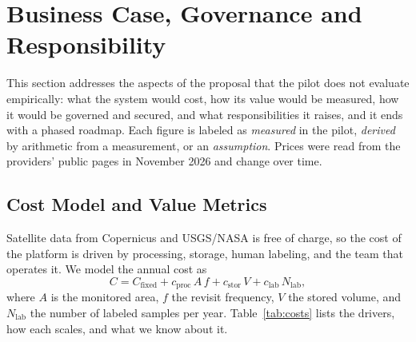 \documentclass{article}
\begin{document}
\section{Business Case, Governance and Responsibility}
\label{sec:business}

This section addresses the aspects of the proposal that the pilot does not
evaluate empirically: what the system would cost, how its value would be
measured, how it would be governed and secured, and what responsibilities it
raises, and it ends with a phased roadmap. Each figure is labeled as
\emph{measured} in the pilot, \emph{derived} by arithmetic from a measurement, or
an \emph{assumption}. Prices were read from the providers' public pages in
November 2026 and change over time.

\subsection{Cost Model and Value Metrics}
\label{sec:costs}

Satellite data from Copernicus and USGS/NASA is free of charge, so the cost of
the platform is driven by processing, storage, human labeling, and the team
that operates it. We model the annual cost as
\begin{equation}
C = C_{\text{fixed}} + c_{\text{proc}}\,A\,f + c_{\text{stor}}\,V + c_{\text{lab}}\,N_{\text{lab}},
\end{equation}
where $A$ is the monitored area, $f$ the revisit frequency, $V$ the stored
volume, and $N_{\text{lab}}$ the number of labeled samples per year.
Table~\ref{tab:costs} lists the drivers, how each scales, and what we know about
it.
\end{document}
